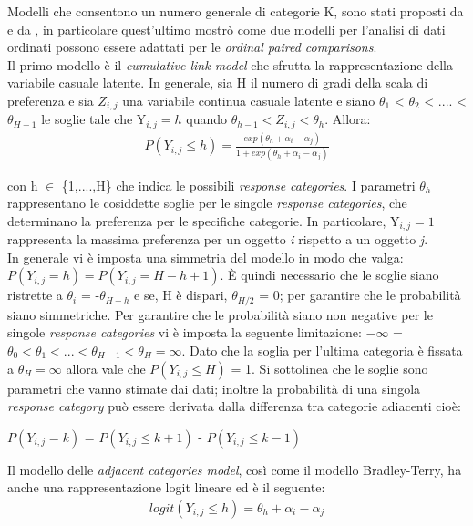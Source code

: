 Modelli che consentono un numero generale di categorie K, sono stati proposti da \autocite{tutz1986bradley} e da \autocite{bradley1952rank}, in particolare quest'ultimo mostrò come due modelli per l'analisi di dati ordinati possono essere adattati per le \emph{ordinal paired comparisons}.\\

Il primo modello è il \emph{cumulative link model} che sfrutta la rappresentazione della variabile casuale latente. In generale, sia H il numero di gradi della scala di preferenza e sia $Z_{i,j}$ una variabile continua casuale latente e siano $\theta_{1} $ < $\theta_{2}$ < .... < $\theta_{H-1}$ le soglie tale che Y$_{i,j} = h$ quando $\theta_{h-1} < Z_{i,j} < \theta_{h}$. Allora:
\begin{align}
	P(Y_{i,j}\leq h) =  \frac{exp(\theta_{h} + \alpha_{i} - \alpha_{j})}{1 + exp(\theta_{h} + \alpha_{i} - \alpha_{j})} \label{for:3.2.1}
\end{align}

con h $\in$ \{1,....,H\} che indica le possibili \emph{response categories}. I parametri $\theta_{h}$ rappresentano le cosiddette soglie per le singole \emph{response categories}, che determinano la preferenza per le specifiche categorie. In particolare, Y$_{i,j} = 1$ rappresenta la massima preferenza per un oggetto \textit{i} rispetto a un oggetto \textit{j}.\\
In generale vi è imposta una simmetria del modello in modo che valga: $P(Y_{i,j} = h) = P(Y_{i,j} = H - h + 1)$. È quindi necessario che le soglie siano ristrette a $\theta_{i}$ = -$\theta_{H-h}$ e se, H è dispari, $\theta_{H/2}$ = 0; per garantire che le probabilità siano simmetriche. Per garantire che le probabilità siano non negative per le singole \emph{response categories} vi è imposta la seguente limitazione: $-\infty$ = $\theta_{0} < \theta_{1} < ... < \theta_{H-1} < \theta_{H} = \infty$. Dato che la soglia per l'ultima categoria è fissata a $\theta_{H} = \infty$ allora vale che $P(Y_{i,j} \leq H)$ = 1. Si sottolinea che le soglie sono parametri che vanno stimate dai dati; inoltre la probabilità di una singola \emph{response category} può essere derivata dalla differenza tra categorie adiacenti cioè:
\begin{center}
	  $P(Y_{i,j} = k)$ = $P(Y_{i,j} \leq k + 1)$ - $P(Y_{i,j} \leq k - 1)$
\end{center}

Il modello delle \emph{adjacent categories model}, così come il modello Bradley-Terry, ha anche una rappresentazione logit lineare ed è il seguente:
\begin{align}
	logit(Y_{i,j}\leq h) =  \theta_{h} + \alpha_i - \alpha_j 
\end{align}


